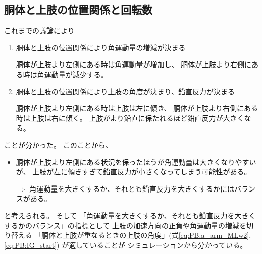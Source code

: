 \documentclass[a4paper,11pt]{jsarticle}
\begin{document}
\subsection{胴体と上肢の位置関係と回転数}
これまでの議論により
\begin{enumerate}
  \item 胴体と上肢の位置関係により角運動量の増減が決まる
  
  胴体が上肢より左側にある時は角運動量が増加し、
  胴体が上肢より右側にある時は角運動量が減少する。
  \item 胴体と上肢の位置関係により上肢の角度が決まり、鉛直反力が決まる
  
  胴体が上肢より左側にある時は上肢は左に傾き、
  胴体が上肢より右側にある時は上肢は右に傾く。
  上肢がより鉛直に保たれるほど鉛直反力が大きくなる。
\end{enumerate}
ことが分かった。
このことから、
\begin{itemize}
  \item 胴体が上肢より左側にある状況を保ったほうが角運動量は大きくなりやすいが、
  上肢が左に傾きすぎて鉛直反力が小さくなってしまう可能性がある。

  $\Rightarrow$ 角運動量を大きくするか、それとも鉛直反力を大きくするかにはバランスがある。
\end{itemize}
と考えられる。
そして
「角運動量を大きくするか、それとも鉛直反力を大きくするかのバランス」の指標として
上肢の加速方向の正負や角運動量の増減を切り替える
「胴体と上肢が重なるときの上肢の角度」(式\ref{eq:PB:a_arm_MLw2}, \ref{eq:PB:IG_start})
が適していることが
シミュレーションから分かっている。
\end{document}
